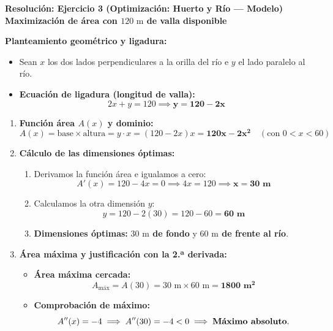 ﻿\documentclass[11pt,a4paper]{article}
\begin{document}
\newpage

\begin{center}
    {\LARGE \textbf{Resolución: Ejercicio 3 (Optimización: Huerto y Río — Modelo)}}\\[4pt]
    {\large \textbf{Maximización de área con $120\text{ m}$ de valla disponible}}
\end{center}

\vspace{0.4cm}
\noindent\textbf{Planteamiento geométrico y ligadura:}
\begin{itemize}[leftmargin=1.5em, itemsep=3pt]
    \item Sean $x$ los dos lados perpendiculares a la orilla del río e $y$ el lado paralelo al río.
    \item \textbf{Ecuación de ligadura (longitud de valla):}
    \[
    2x + y = 120 \implies \mathbf{y = 120 - 2x}
    \]
\end{itemize}

\vspace{0.2cm}
\begin{enumerate}[label=\textbf{\alph*)}, leftmargin=2em, itemsep=8pt]
    \item \textbf{Función área $A(x)$ y dominio:}
    \[
    A(x) = \text{base} \times \text{altura} = y \cdot x = (120 - 2x)x = \mathbf{120x - 2x^2} \quad (\text{con } 0 < x < 60)
    \]

    \item \textbf{Cálculo de las dimensiones óptimas:}
    \begin{enumerate}[label=\arabic*., leftmargin=1.5em, itemsep=2pt]
        \item Derivamos la función área e igualamos a cero:
        \[
        A'(x) = 120 - 4x = 0 \implies 4x = 120 \implies \mathbf{x = 30\text{ m}}
        \]
        \item Calculamos la otra dimensión $y$:
        \[
        y = 120 - 2(30) = 120 - 60 = \mathbf{60\text{ m}}
        \]
        \item \textbf{Dimensiones óptimas:} \textbf{$30\text{ m}$ de fondo} y \textbf{$60\text{ m}$ de frente al río}.
    \end{enumerate}

    \item \textbf{Área máxima y justificación con la 2.ª derivada:}
    \begin{itemize}[leftmargin=1.5em, itemsep=2pt]
        \item \textbf{Área máxima cercada:}
        \[
        A_{\text{máx}} = A(30) = 30\text{ m} \times 60\text{ m} = \mathbf{1800\text{ m}^2}
        \]
        \item \textbf{Comprobación de máximo:}
        \[
        A''(x) = -4 \implies A''(30) = -4 < 0 \implies \text{\textbf{Máximo absoluto}}.
        \]
    \end{itemize}
\end{enumerate}
\end{document}
